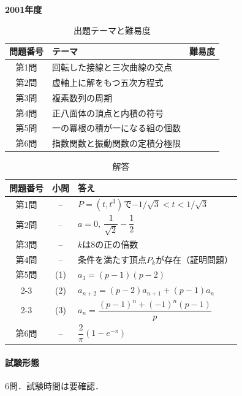 \documentclass[../../main.tex]{subfiles}
\begin{document}
\begin{center}
  {\fontsize{48pt}{58pt}\selectfont \textbf{2001}\normalsize\textbf{年度}}
\end{center}

\begin{table}[htb]
  \centering
  \caption{出題テーマと難易度}
  \begin{tabular}{|c|p{9cm}|c|}
    \hline
    \textbf{問題番号} & \textbf{テーマ} & \textbf{難易度} \\
    \hline
    第1問 & 回転した接線と三次曲線の交点 & \\
    \hline
    第2問 & 虚軸上に解をもつ五次方程式 & \\
    \hline
    第3問 & 複素数列の周期 & \\
    \hline
    第4問 & 正八面体の頂点と内積の符号 & \\
    \hline
    第5問 & 一の冪根の積が一になる組の個数 & \\
    \hline
    第6問 & 指数関数と振動関数の定積分極限 & \\
    \hline
  \end{tabular}
\end{table}

\begin{table}[htb]
  \centering
  \caption{解答}
  \renewcommand{\arraystretch}{1.4}
  \begin{tabular}{|c|c|p{9cm}|}
    \hline
    \textbf{問題番号} & \textbf{小問} & \textbf{答え} \\
    \hline
    第1問 & -- & $P=(t,t^3)$で$-1/\sqrt{3}<t<1/\sqrt{3}$ \\
    \hline
    第2問 & -- & $a=0,\ \dfrac{1}{\sqrt{2}}-\dfrac{1}{2}$ \\
    \hline
    第3問 & -- & $k$は$8$の正の倍数 \\
    \hline
    第4問 & -- & 条件を満たす頂点$P_k$が存在（証明問題） \\
    \hline
    第5問 & (1) & $a_3=(p-1)(p-2)$ \\
    \cline{2-3}
    & (2) & $a_{n+2}=(p-2)a_{n+1}+(p-1)a_n$ \\
    \cline{2-3}
    & (3) & $a_n=\dfrac{(p-1)^n+(-1)^n(p-1)}{p}$ \\
    \hline
    第6問 & -- & $\dfrac{2}{\pi}(1-e^{-\pi})$ \\
    \hline
  \end{tabular}
\end{table}

\paragraph{試験形態}
6問．試験時間は要確認．
\end{document}
